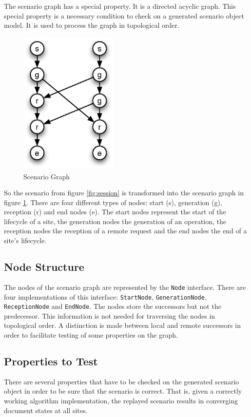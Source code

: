 \documentclass[11pt,a4paper]{article}
\begin{document}
The scenario graph has a special property. It is a directed acyclic graph. This special property is a necessary condition to check on a generated scenario object model. It is used to process the graph in topological order.

\begin{figure}[H]
 \centering
 \includegraphics[width=4.9cm,height=7.2cm]{../../images/testframework.eps}
 \caption{Scenario Graph}
 \label{fig:graph}
\end{figure}

So the scenario from figure \ref{fig:session} is transformed into the scenario graph in figure \ref{fig:graph}. There are four different types of nodes: start (s), generation (g), reception (r) and end nodes (e). The start nodes represent the start of the lifecycle of a site, the generation nodes the generation of an operation, the reception nodes the reception of a remote request and the end nodes the end of a site's lifecycle. 


\subsection{Node Structure}
The nodes of the scenario graph are represented by the \texttt{Node} interface. There are four implementations of this interface: \texttt{StartNode}, \texttt{GenerationNode}, \texttt{ReceptionNode} and \texttt{EndNode}. The nodes store the successors but not the predecessor. This information is not needed for traversing the nodes in topological order. A distinction is made between local and remote successors in order to facilitate testing of some properties on the graph.


\subsection{Properties to Test}
There are several properties that have to be checked on the generated scenario object in order to be sure that the scenario is correct. That is, given a correctly working algorithm implementation, the replayed scenario results in converging document states at all sites.
\end{document}
